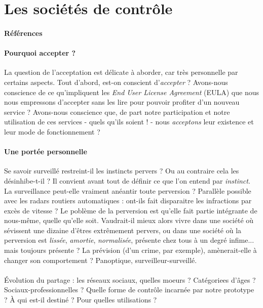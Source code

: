 \section{Les sociétés de contrôle}
\paragraph{Références} \cite{Huxley0} \cite{Orwell0} \cite{TechnoSocio1}

\paragraph{Pourquoi accepter ?} La question de l'acceptation est délicate à aborder, car
très personnelle par certains aspects. Tout d'abord, est-on conscient d'\emph{accepter} ?
Avons-nous conscience de ce qu'impliquent les \emph{End User License Agreement} (EULA) que
nous nous empressons d'accepter sans les lire pour pouvoir profiter d'un nouveau service ?
Avons-nous conscience que, de part notre participation et notre utilisation de ces services
- quels qu'ils soient ! - nous \emph{acceptons} leur existence et leur mode de fonctionnement ?

\paragraph{Une portée personnelle} Se savoir surveillé restreint-il les instincts pervers ?
Ou au contraire cela les désinhibe-t-il ? Il convient avant tout de définir ce que l'on
entend par \emph{instinct}. La surveillance peut-elle vraiment anéantir toute perversion ?
Parallèle possible avec les radars routiers automatiques : ont-ils fait disparaitre les
infractions par excès de vitesse ? Le poblème de la perversion est qu'elle fait partie
intégrante de nous-même, quelle qu'elle soit. Vaudrait-il mieux alors vivre dans une société
où sévissent une dizaine d'êtres extrêmement pervers, ou dans une société où la perversion
est \emph{lissée}, \emph{amortie}, \emph{normalisée}, présente chez tous à un degré infime...
mais toujours présente ? La prévision (d'un crime, par exemple), amènerait-elle à changer
son comportement ? Panoptique, surveilleur-surveillé. 

\paragraph{} Évolution du partage : les réseaux sociaux, quelles moeurs ? Catégoriees d'âges ? Sociaux-professionnelles ?
Quelle forme de contrôle incarnée par notre prototype ? À qui est-il destiné ? Pour quelles utilisations ?